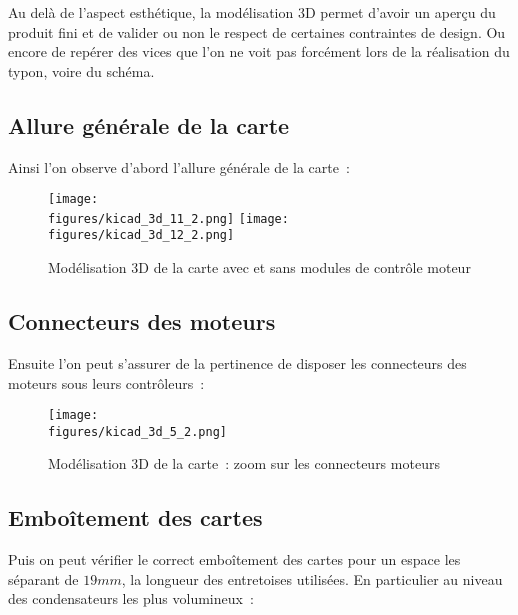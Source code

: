 Au delà de l'aspect esthétique, la modélisation 3D permet d'avoir un aperçu du produit fini et de valider ou non le respect de certaines contraintes de design. Ou encore de repérer des vices que l'on ne voit pas forcément lors de la réalisation du typon, voire du schéma.

\subsection{Allure générale de la carte}

Ainsi l'on observe d'abord l'allure générale de la carte~:

\begin{figure}[H]
    \centering
    \texttt{[image: \\figures/kicad\_3d\_11\_2.png]}
    \texttt{[image: \\figures/kicad\_3d\_12\_2.png]}
    \decoRule
    \caption[
    Modélisation 3D de la carte avec et sans modules de contrôle moteur]{
    Modélisation 3D de la carte avec et sans modules de contrôle moteur}
    \label{fig:Modélisation 3D de la carte avec et sans modules de contrôle moteur}
    \end{figure}

\subsection{Connecteurs des moteurs}

Ensuite l'on peut s'assurer de la pertinence de disposer les connecteurs des moteurs sous leurs contrôleurs~:

\begin{figure}[H]
    \centering
    \texttt{[image: \\figures/kicad\_3d\_5\_2.png]}
    \decoRule
    \caption[
    Modélisation 3D de la carte~: zoom sur les connecteurs moteurs]{
    Modélisation 3D de la carte~: zoom sur les connecteurs moteurs}
    \label{fig:Modélisation 3D de la carte : zoom sur les connecteurs moteurs}
    \end{figure}

\subsection{Emboîtement des cartes}

Puis on peut vérifier le correct emboîtement des cartes pour un espace les séparant de $19mm$, la longueur des entretoises utilisées. En particulier au niveau des condensateurs les plus volumineux~:

